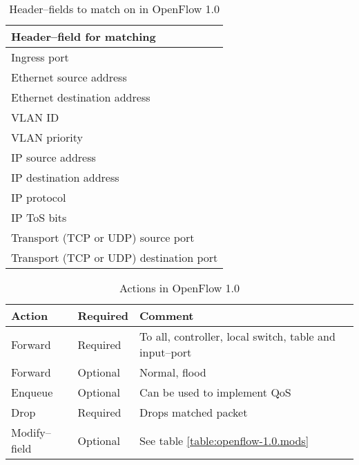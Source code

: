 \begin{table}
\begin{tabular}{|l|}
\hline \textbf{Header--field for matching} \\
\hline Ingress port \\
\hline Ethernet source address \\
\hline Ethernet destination address \\
\hline VLAN ID \\
\hline VLAN priority \\
\hline IP source address \\
\hline IP destination address \\
\hline IP protocol \\
\hline IP \ac{ToS} bits \\
\hline Transport (TCP or UDP) source port \\
\hline Transport (TCP or UDP) destination port \\
\hline
\end{tabular}
\caption{Header--fields to match on in OpenFlow 1.0}
\label{table:openflow-1.0.headers}
\end{table}

\begin{table}
\begin{tabular}{|l|l|l|}
\hline \textbf{Action} &
       \textbf{Required} &
       \textbf{Comment} \\
\hline Forward & Required & To all, controller, local switch, table and input--port \\
\hline Forward & Optional & Normal, flood \\
\hline Enqueue & Optional &  Can be used to implement \ac{QoS} \\
\hline Drop    & Required &  Drops matched packet \\
\hline Modify--field & Optional &  See table \ref{table:openflow-1.0.mods} \\
\hline
\end{tabular}
\caption{Actions in OpenFlow 1.0}
\label{table:openflow-1.0.actions}
\end{table}


